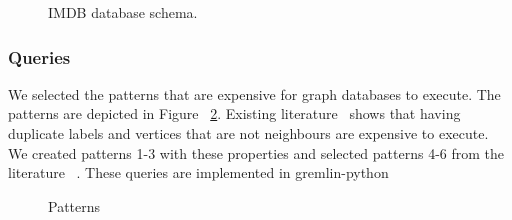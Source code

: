 \begin{figure}[t]
\centering
{}
\caption{IMDB database schema.}
\label{fig:schema}
\centering
\end{figure}

\subsubsection{Queries}

We selected the patterns that are expensive for graph databases to execute. The patterns are depicted in Figure ~\ref{fig:query}. Existing literature~\cite{tripoulthere} shows that having duplicate labels and vertices that are not neighbours are expensive to execute. We created patterns 1-3 with these properties and selected patterns 4-6 from the literature ~\cite{tripoulthere}. These queries are implemented in gremlin-python 

\begin{figure}[t]
\centering
{}
\caption{Patterns}
\label{fig:query}
\centering
\end{figure} 


